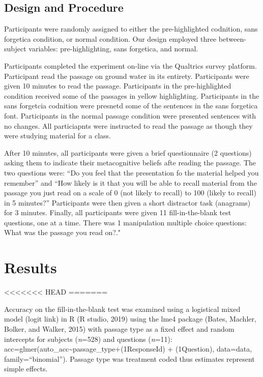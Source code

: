 \documentclass[pdf]{apa6}
\begin{document}
\hypertarget{design-and-procedure-1}{%
\subsection{Design and Procedure}\label{design-and-procedure-1}}

Participants were randomly assigned to either the pre-highlighted codnition, sans forgetica condition, or normal condition. Our design employed three between-subject variables: pre-highlighting, sans forgetica, and normal.

Participants completed the experiment on-line via the Qualtrics survey platform. Participant read the passage on ground water in its entirety. Participants were given 10 minutes to read the passage. Participants in the pre-highlighted condition received some of the passages in yellow highlighting. Participants in the sans forgetcia codnition were presnetd some of the sentences in the sans forgetica font. Participants in the normal passage condition were presented sentences with no changes. All particiapnts were instructed to read the passage as though they were studying material for a class.

After 10 minutes, all participants were given a brief questionnaire (2 questions) asking them to indicate their metacognitive beliefs afte reading the passage. The two questions were: \enquote{Do you feel that the presentation fo the material helped you remember} and \enquote{How likely is it that you will be able to recall material from the passage you just read on a scale of 0 (not likely to recall) to 100 (likely to recall) in 5 minutes?} Participants were then given a short distractor task (anagrams) for 3 minutes. Finally, all participants were given 11 fill-in-the-blank test questions, one at a time. There was 1 manipulation multiple choice questions: What was the passage you read on?."

\hypertarget{results-1}{%
\section{Results}\label{results-1}}
<<<<<<< HEAD
=======

Accuracy on the fill-in-the-blank test was examined using a logistical mixed model (logit link) in R (R studio, 2019) using the lme4 package (Bates, Machler, Bolker, and Walker, 2015) with passage type as a fixed effect and random intercepts for subjects (\emph{n}=528) and questions (\emph{n}=11): acc=glmer(auto\_acc\textasciitilde{}passage\_type+(1\textbar{}ResponseId) + (1\textbar{}Question), data=data, family=\enquote{binomial}). Passage type was treatment coded thus estimates represent simple effects.
\end{document}
